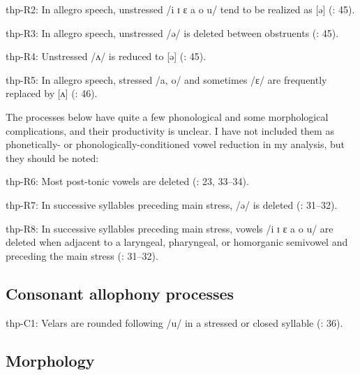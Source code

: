 {\begin{appendixdesc}
\item[thp-R2:] In allegro speech, unstressed /i ɪ ɛ a o u/ tend to be realized as [ə] (\citealt{ThompsonThompson1992}: 45).

\item[thp-R3:] In allegro speech, unstressed /ə/ is deleted between obstruents (\citealt{ThompsonThompson1992}: 45).

\item[thp-R4:] Unstressed /ʌ/ is reduced to [ə] (\citealt{ThompsonThompson1992}: 45).

\item[thp-R5:] In allegro speech, stressed /a, o/ and sometimes /ɛ/ are frequently replaced by [ʌ] (\citealt{ThompsonThompson1992}: 46).

The processes below have quite a few phonological and some morphological complications, and their productivity is unclear. I have not included them as phonetically- or phonologically-conditioned vowel reduction in my analysis, but they should be noted:

\item[thp-R6:] Most post-tonic vowels are deleted (\citealt{ThompsonThompson1992}: 23, 33--34).

\item[thp-R7:] In successive syllables preceding main stress, /ə/ is deleted (\citealt{ThompsonThompson1992}: 31--32).

\item[thp-R8:] In successive syllables preceding main stress, vowels /i ɪ ɛ a o u/ are deleted when adjacent to a laryngeal, pharyngeal, or homorganic semivowel and preceding the main stress (\citealt{ThompsonThompson1992}: 31--32).
\end{appendixdesc}
\subsection*{Consonant allophony processes}
\begin{appendixdesc}

\item[thp-C1:] Velars are rounded following /u/ in a stressed or closed syllable (\citealt{ThompsonThompson1992}: 36).
\end{appendixdesc}
\subsection*{Morphology}

\begin{appendixdesc}


\end{appendixdesc}}
